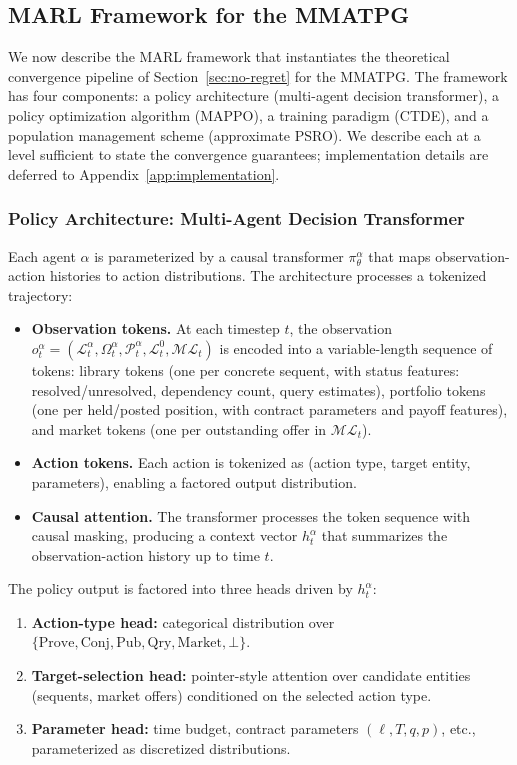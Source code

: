 \subsection{MARL Framework for the MMATPG}\label{sec:marl-framework}

We now describe the MARL framework that instantiates the theoretical convergence pipeline of Section~\ref{sec:no-regret} for the MMATPG. The framework has four components: a policy architecture (multi-agent decision transformer), a policy optimization algorithm (MAPPO), a training paradigm (CTDE), and a population management scheme (approximate PSRO). We describe each at a level sufficient to state the convergence guarantees; implementation details are deferred to Appendix~\ref{app:implementation}.


\subsubsection{Policy Architecture: Multi-Agent Decision Transformer}

Each agent $\alpha$ is parameterized by a causal transformer $\pi^\alpha_\theta$ that maps observation-action histories to action distributions. The architecture processes a tokenized trajectory:

\begin{itemize}
    \item \textbf{Observation tokens.} At each timestep $t$, the observation $o^\alpha_t = (\mathcal{L}^\alpha_t, \Omega^\alpha_t, \mathcal{P}^\alpha_t, \mathcal{L}^0_t, \mathcal{ML}_t)$ is encoded into a variable-length sequence of tokens: library tokens (one per concrete sequent, with status features: resolved/unresolved, dependency count, query estimates), portfolio tokens (one per held/posted position, with contract parameters and payoff features), and market tokens (one per outstanding offer in $\mathcal{ML}_t$).
    
    \item \textbf{Action tokens.} Each action is tokenized as (action type, target entity, parameters), enabling a factored output distribution.
    
    \item \textbf{Causal attention.} The transformer processes the token sequence with causal masking, producing a context vector $h^\alpha_t$ that summarizes the observation-action history up to time $t$.
\end{itemize}

The policy output is factored into three heads driven by $h^\alpha_t$:
\begin{enumerate}
    \item \textbf{Action-type head:} categorical distribution over $\{\mathrm{Prove}, \mathrm{Conj}, \mathrm{Pub}, \mathrm{Qry}, \mathrm{Market}, \bot\}$.
    \item \textbf{Target-selection head:} pointer-style attention over candidate entities (sequents, market offers) conditioned on the selected action type.
    \item \textbf{Parameter head:} time budget, contract parameters $(\ell, T, q, p)$, etc., parameterized as discretized distributions.
\end{enumerate}

